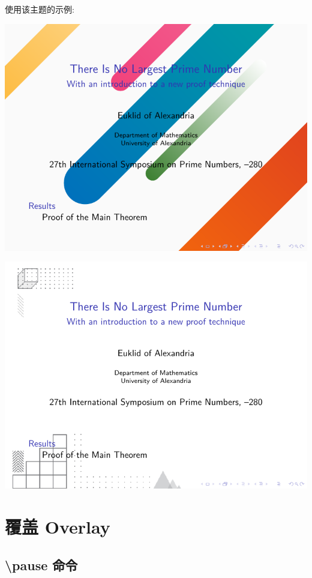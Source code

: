 \begin{column}{0.5\textwidth}
\inputminted[linenos=true]{latex}{examples/beamer/themes/background/beamerthemenovel.sty}

使用该主题的示例:

\includegraphics[page=1]{examples/beamer/themes/background/sample01.pdf}

\includegraphics[page=1]{examples/beamer/themes/background/sample02.pdf}

\section{覆盖 Overlay}

\subsection{{\ttfamily \textbackslash pause} 命令}


\end{column}
